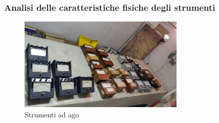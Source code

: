 \documentclass[aspectratio=169]{beamer}
\begin{document}
\begin{frame}
\frametitle{Analisi delle caratteristiche fisiche degli strumenti}

\begin{figure}[h]
  \centering
  \includegraphics[width=0.7\textwidth]{strumentiago}
  \caption{Strumenti ad ago}
\end{figure}
\end{frame}
\end{document}
